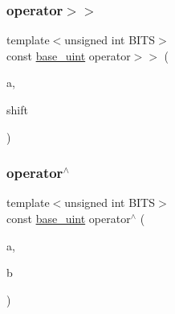 \mbox{\label{classbase__uint_a9d619adcbf9ad5539f5e98f739edd15d}} 
\subsubsection{\texorpdfstring{operator$>$$>$}{operator>>}}
{\footnotesize\ttfamily template$<$unsigned int B\+I\+TS$>$ \\
const \mbox{\hyperlink{classbase__uint}{base\+\_\+uint}} operator$>$$>$ (\begin{DoxyParamCaption}\item[{const \mbox{\hyperlink{classbase__uint}{base\+\_\+uint}}$<$ B\+I\+TS $>$ \&}]{a,  }\item[{int}]{shift }\end{DoxyParamCaption})\hspace{0.3cm}{\ttfamily [friend]}}

\mbox{\label{classbase__uint_aa9c66282ad78846e8310984aeb2df49d}} 
\subsubsection{\texorpdfstring{operator$^\wedge$}{operator^}}
{\footnotesize\ttfamily template$<$unsigned int B\+I\+TS$>$ \\
const \mbox{\hyperlink{classbase__uint}{base\+\_\+uint}} operator$^\wedge$ (\begin{DoxyParamCaption}\item[{const \mbox{\hyperlink{classbase__uint}{base\+\_\+uint}}$<$ B\+I\+TS $>$ \&}]{a,  }\item[{const \mbox{\hyperlink{classbase__uint}{base\+\_\+uint}}$<$ B\+I\+TS $>$ \&}]{b }\end{DoxyParamCaption})\hspace{0.3cm}{\ttfamily [friend]}}

\mbox{\label{classbase__uint_af11d7776598f6633c139636314f065d6}} 
